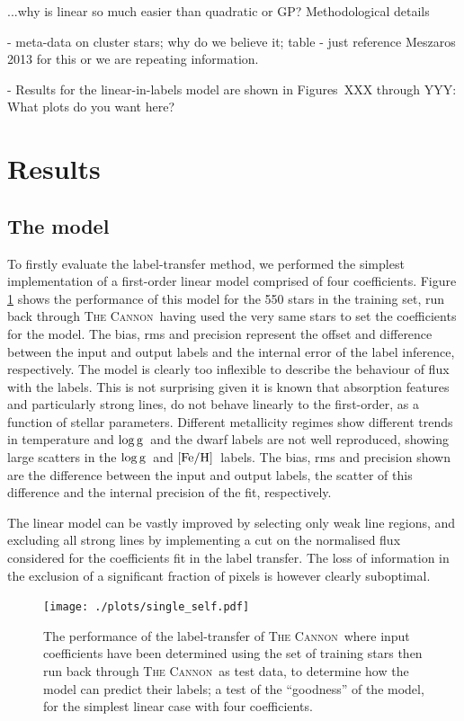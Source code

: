 \documentclass[12pt, preprint]{aastex}
\newcommand{\feh}{\mbox{$\rm [Fe/H]$}}
\newcommand{\logg}{\mbox{$\rm \log g$}}
\newcommand{\tc}{\textsc{The Cannon}}
\begin{document}
...why is linear so much easier than quadratic or GP?  Methodological details

- meta-data on cluster stars; why do we believe it; table - just reference Meszaros 2013 for this or we are repeating information. 

- Results for the linear-in-labels model are shown in Figures~XXX through YYY: What plots do you want here? 

\section{Results}
\label{sec:results}

\subsection{The model} 

To firstly evaluate the label-transfer method, we performed the simplest implementation of a first-order linear model comprised of four coefficients. Figure \ref{fig:self1} shows the performance of this model for the 550 stars in the training set, run back through \tc\, having used the very same stars to set the coefficients for the model. The bias, rms and precision represent the offset and difference between the input and output labels and the internal error of the label inference, respectively. The model is clearly too inflexible to describe the behaviour of flux with the labels. This is not surprising given it is known that absorption features and particularly strong lines, do not behave linearly to the first-order, as a function of stellar parameters. Different metallicity regimes show different trends in  temperature and \logg\ and the dwarf labels are not well reproduced, showing large scatters in the \logg\ and \feh\ labels. The bias, rms and precision shown are the difference between the input and output labels, the scatter of this difference and the internal precision of the fit, respectively. 

The linear model can be vastly improved by selecting only weak line regions, and excluding all strong lines by implementing a cut on the normalised flux considered for the coefficients fit in the label transfer. The loss of information in the exclusion of a significant fraction of pixels is however clearly suboptimal. 

\begin{figure}[h!]
\centering
  \texttt{[image: ./plots/single\_self.pdf]}
\caption{The performance of the label-transfer of \tc\, where input coefficients have been determined using the set of training stars then run back through \tc\ as test data, to determine how the model can predict their labels; a test of the ``goodness'' of the model, for the simplest linear case with four coefficients. }
\label{fig:self1}
\end{figure}
\end{document}
